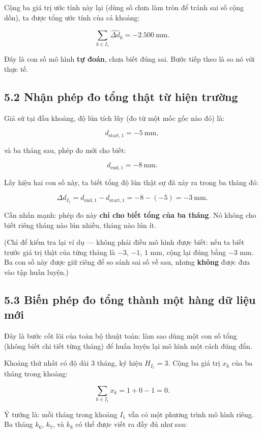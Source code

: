 \documentclass[12pt]{article}
\begin{document}
Cộng ba giá trị ước tính này lại (dùng số chưa làm tròn để tránh sai số cộng dồn), ta được tổng ước tính của cả khoảng:

\[
\sum_{k\in I_1}\widehat{\Delta d}_k
=
-2.500\ \mathrm{mm}.
\]

Đây là con số mô hình \textbf{tự đoán}, chưa biết đúng sai. Bước tiếp theo là so nó với thực tế.

\subsection{5.2 Nhận phép đo tổng thật từ hiện trường}

Giả sử tại đầu khoảng, độ lún tích lũy (đo từ một mốc gốc nào đó) là:

\[
d_{\mathrm{start},1}=-5\ \mathrm{mm},
\]

và ba tháng sau, phép đo mới cho biết:

\[
d_{\mathrm{end},1}=-8\ \mathrm{mm}.
\]

Lấy hiệu hai con số này, ta biết tổng độ lún thật sự đã xảy ra trong ba tháng đó:

\[
\Delta d_{I_1}
=
d_{\mathrm{end},1}-d_{\mathrm{start},1}
=
-8-(-5)
=
-3\ \mathrm{mm}.
\]

Cần nhấn mạnh: phép đo này \textbf{chỉ cho biết tổng của ba tháng}. Nó không cho biết riêng tháng nào lún nhiều, tháng nào lún ít.

(Chỉ để kiểm tra lại ví dụ — không phải điều mô hình được biết: nếu ta biết trước giá trị thật của từng tháng là $-3$, $-1$, $1$ mm, cộng lại đúng bằng $-3$ mm. Ba con số này được giữ riêng để so sánh sai số về sau, nhưng \textbf{không} được đưa vào tập huấn luyện.)

\subsection{5.3 Biến phép đo tổng thành một hàng dữ liệu mới}

Đây là bước cốt lõi của toàn bộ thuật toán: làm sao dùng một con số tổng (không biết chi tiết từng tháng) để huấn luyện lại mô hình một cách đúng đắn.

Khoảng thứ nhất có độ dài 3 tháng, ký hiệu $H_{I_1}=3$. Cộng ba giá trị $x_k$ của ba tháng trong khoảng:

\[
\sum_{k\in I_1}x_k
=
1+0-1
=
0.
\]

Ý tưởng là: mỗi tháng trong khoảng $I_1$ vẫn có một phương trình mô hình riêng. Ba tháng $k_6$, $k_7$, và $k_8$ có thể được viết ra đầy đủ như sau:
\end{document}

